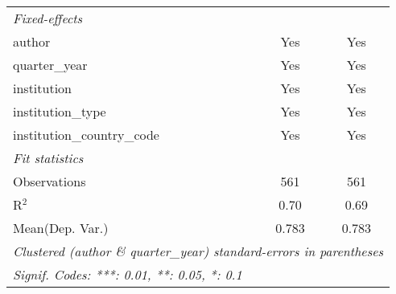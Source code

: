 \begin{tabular}{lcc}
   \midrule
   \emph{Fixed-effects}\\
   author                                   & Yes          & Yes\\  
   quarter\_year                            & Yes          & Yes\\  
   institution                              & Yes          & Yes\\  
   institution\_type                        & Yes          & Yes\\  
   institution\_country\_code               & Yes          & Yes\\  
   \midrule
   \emph{Fit statistics}\\
   Observations                             & 561          & 561\\  
   R$^2$                                    & 0.70         & 0.69\\  
Mean(Dep. Var.) & 0.783 & 0.783 \\
   \midrule \midrule
   \multicolumn{3}{l}{\emph{Clustered (author \& quarter\_year) standard-errors in parentheses}}\\
   \multicolumn{3}{l}{\emph{Signif. Codes: ***: 0.01, **: 0.05, *: 0.1}}\\
\end{tabular}
\par\endgroup
